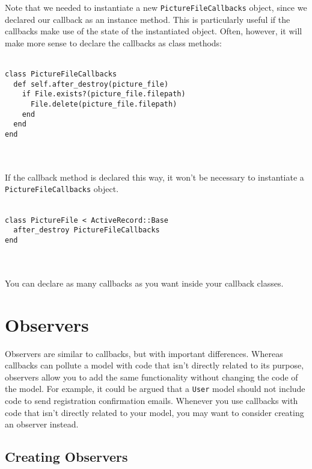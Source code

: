 \documentclass[10pt]{book}
\begin{document}
Note that we needed to instantiate a new \texttt{PictureFileCallbacks}  object, since we declared our callback as an instance method. This is  particularly useful if the callbacks make use of the state of the  instantiated object. Often, however, it will make more sense to declare  the callbacks as class methods:
\\ \\
\begin{minipage}{\textwidth}{\scriptsize
\begin{verbatim}
class PictureFileCallbacks
  def self.after_destroy(picture_file)
    if File.exists?(picture_file.filepath)
      File.delete(picture_file.filepath)
    end
  end
end
\end{verbatim}}
\end{minipage}
\\ \\

If the callback method is declared this way, it won’t be necessary to instantiate a \texttt{PictureFileCallbacks} object.
\\ \\
\begin{minipage}{\textwidth}{\scriptsize
\begin{verbatim}
class PictureFile < ActiveRecord::Base
  after_destroy PictureFileCallbacks
end
\end{verbatim}}
\end{minipage}
\\ \\

You can declare as many callbacks as you want inside your callback classes.

\section{ Observers}

Observers are similar to callbacks, but with important differences.  Whereas callbacks can pollute a model with code that isn’t directly  related to its purpose, observers allow you to add the same  functionality without changing the code of the model. For example, it  could be argued that a \texttt{User} model should not include code to  send registration confirmation emails. Whenever you use callbacks with  code that isn’t directly related to your model, you may want to consider  creating an observer instead.

\subsection{ Creating Observers}
\end{document}
